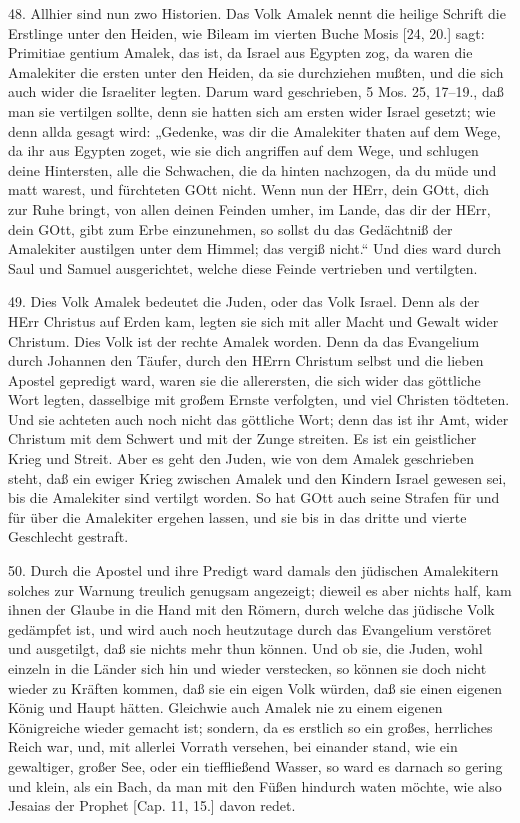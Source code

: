 48. Allhier sind nun zwo Historien. Das Volk Amalek nennt die heilige Schrift die Erstlinge unter den Heiden, wie Bileam im vierten Buche Mosis [24, 20.] sagt: Primitiae gentium Amalek, das ist, da Israel aus Egypten zog, da waren die Amalekiter die ersten unter den
Heiden, da sie durchziehen mußten, und die sich auch wider die Israeliter legten. Darum ward geschrieben, 5 Mos. 25, 17–19., daß man sie vertilgen sollte, denn sie hatten sich am ersten wider Israel gesetzt; wie denn allda gesagt wird: „Gedenke, was dir die Amalekiter thaten auf dem Wege, da ihr aus Egypten zoget, wie sie dich angriffen auf dem Wege, und schlugen deine Hintersten, alle die Schwachen, die da hinten nachzogen, da du müde und matt warest, und fürchteten GOtt nicht. Wenn nun der HErr, dein GOtt, dich zur Ruhe bringt, von allen deinen Feinden umher, im Lande, das dir der HErr, dein GOtt, gibt zum Erbe einzunehmen, so sollst du das Gedächtniß der Amalekiter austilgen unter dem Himmel; das vergiß nicht.“ Und dies ward durch Saul und Samuel ausgerichtet, welche diese Feinde vertrieben und vertilgten.

49. Dies Volk Amalek bedeutet die Juden, oder das Volk Israel. Denn als der HErr Christus auf Erden kam, legten sie sich mit aller Macht und Gewalt wider Christum. Dies Volk ist der rechte Amalek worden. Denn da das Evangelium durch Johannen den Täufer, durch den HErrn Christum selbst und die lieben Apostel gepredigt ward, waren sie die allerersten, die sich wider das göttliche Wort legten, dasselbige mit großem Ernste verfolgten, und viel Christen tödteten. Und sie achteten auch noch nicht das göttliche Wort; denn das ist ihr Amt, wider Christum mit dem Schwert und mit der Zunge streiten. Es ist ein geistlicher Krieg und Streit. Aber es geht den Juden, wie von dem Amalek geschrieben steht, daß ein ewiger Krieg zwischen Amalek und den Kindern Israel gewesen sei, bis die Amalekiter sind vertilgt worden. So hat GOtt auch seine Strafen für und für über die Amalekiter ergehen lassen, und sie bis in das dritte und vierte Geschlecht gestraft.

50. Durch die Apostel und ihre Predigt ward damals den jüdischen Amalekitern solches zur Warnung treulich genugsam angezeigt; dieweil es aber nichts half, kam ihnen der Glaube in die Hand mit den Römern, durch welche das jüdische Volk gedämpfet ist, und wird auch noch heutzutage durch das Evangelium verstöret und ausgetilgt, daß sie nichts mehr thun können. Und ob sie, die Juden, wohl einzeln in die Länder sich hin und wieder verstecken, so können sie doch nicht wieder zu Kräften kommen, daß sie ein eigen Volk würden, daß sie einen eigenen König und Haupt hätten. Gleichwie auch Amalek nie zu einem eigenen Königreiche wieder gemacht ist; sondern, da es erstlich so ein großes, herrliches Reich war, und, mit allerlei Vorrath versehen, bei einander stand, wie ein gewaltiger, großer See, oder ein tieffließend Wasser, so ward es darnach so gering und klein, als ein Bach, da man mit den Füßen hindurch waten möchte, wie also Jesaias der Prophet [Cap. 11, 15.] davon redet.

